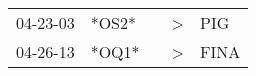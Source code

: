 \begin{supertabular}{p{0.07\textwidth}p{0.06\textwidth}p{0.02\textwidth}p{0.02\textwidth}p{0.06\textwidth}}
 04-23-03\textsuperscript{} &  *OS2* &   &  \textgreater &   PIG\textsuperscript{} \\
 04-26-13\textsuperscript{} &  *OQ1* &   &  \textgreater &  FINA\textsuperscript{} \\
\end{supertabular}
